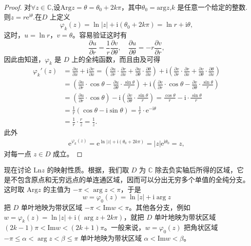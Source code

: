 \documentclass[../../main.tex]{subfiles}%
\begin{document}
\begin{proof}

对\(\forall z\in \mathbb{C} \),设\(\mathrm{Arg}z = \theta = \theta_0 + 2k\pi \)，其中$\theta_0=\mathrm{arg}z$,\( k \) 是任意一个给定的整数.则$z=r\mathrm{e}^{\mathrm{i}\theta}$.在\( D \) 上定义
\[
\varphi_{k}(z) = \ln|z| + \mathrm{i}(\theta_0 + 2k\pi) = \ln r + \mathrm{i}\theta,
\]
这时，\( u = \ln r \)，\( v = \theta \)。容易验证这时有
\[
\frac{\partial u}{\partial r} = \frac{1}{r} \frac{\partial v}{\partial \theta},\quad 
\frac{\partial u}{\partial \theta} = -r \frac{\partial v}{\partial r},
\]
因此由知道，\( \varphi_{k} \) 是 \( D \) 上的全纯函数，而且由及可得
\begin{align*}
\varphi _{k}'(z)&=\frac{\partial u}{\partial x}+\mathrm{i}\frac{\partial v}{\partial x}=\left( \frac{\partial u}{\partial r}\cdot \frac{\partial r}{\partial x}+\frac{\partial u}{\partial \theta}\cdot \frac{\partial \theta}{\partial x} \right) +\mathrm{i}\left( \frac{\partial v}{\partial r}\cdot \frac{\partial r}{\partial x}+\frac{\partial v}{\partial \theta}\cdot \frac{\partial \theta}{\partial x} \right) 
\\
&=\left( \frac{\partial u}{\partial r}\cdot \cos \theta -\frac{\partial u}{\partial \theta}\cdot \frac{\sin \theta}{r} \right) +\mathrm{i}\left( \frac{\partial v}{\partial r}\cdot \cos \theta -\frac{\partial v}{\partial \theta}\cdot \frac{\sin \theta}{r} \right) 
\\
&=\left( \frac{\partial u}{\partial r}\cdot \cos \theta \right) -\mathrm{i}\left( \frac{\partial v}{\partial \theta}\cdot \frac{\sin \theta}{r} \right) =\frac{\cos \theta}{r}-\mathrm{i}\cdot \frac{\sin \theta}{r}
\\
&=\frac{1}{r}\left( \cos \theta -\mathrm{i}\sin \theta \right) =\frac{1}{r}\cdot \mathrm{e}^{-\mathrm{i}\theta}
\\
&=\frac{1}{r}\cdot \frac{r}{z}=\frac{1}{z}.
\end{align*}
此外
\begin{align*}
\mathrm{e}^{\varphi_k(z)} = \mathrm{e}^{\ln|z| + \mathrm{i}(\theta_0 + 2k\pi)} = |z| \mathrm{e}^{\mathrm{i}\theta_0} = z,
\end{align*}
对每一点 \( z \in D \) 成立。

\end{proof}

现在讨论 \( \mathrm{Ln} z \) 的映射性质。根据，我们取 \( D \) 为 \( \mathbb{C} \) 除去负实轴后所得的区域，它是不包含原点和无穷远点的单连通区域，因而可以分出无穷多个单值的全纯分支。这时取 \( \mathrm{Arg} z \) 的主值为 \( -\pi < \arg z < \pi \)，于是
\[
w = \varphi_0(z) = \ln|z| + \mathrm{i}\arg z
\]
把 \( D \) 单叶地映为带状区域 \( -\pi < \mathrm{Im} w < \pi \)。其他各分支，例如 \( w = \varphi_k(z)=\ln|z| + \mathrm{i}(\arg z + 2k\pi) \)，就把 \( D \) 单叶地映为带状区域 \( (2k - 1)\pi < \mathrm{Im} w < (2k + 1)\pi \)。一般来说，\( w = \varphi_0(z) \) 把角状区域 \( -\pi \leqslant \alpha < \arg z < \beta \leqslant \pi \) 单叶地映为带状区域 \( \alpha < \mathrm{Im} w < \beta \)。
\end{document}
